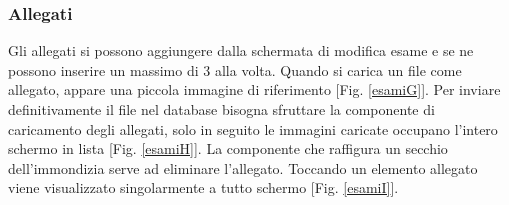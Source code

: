 \documentclass[12pt,a4paper,openright,twoside]{report}
\begin{document}
\subsubsection{Allegati}
Gli allegati si possono aggiungere dalla schermata di modifica esame e se ne possono inserire un massimo di 3 alla volta.
Quando si carica un file come allegato, appare una piccola immagine di riferimento [Fig. \ref{esamiG}]. Per inviare definitivamente il file nel database bisogna sfruttare la componente di caricamento degli allegati, solo in seguito le immagini caricate occupano l'intero schermo in lista [Fig. \ref{esamiH}]. La componente che raffigura un secchio dell'immondizia serve ad eliminare l'allegato.
Toccando un elemento allegato viene visualizzato singolarmente a tutto schermo [Fig. \ref{esamiI}].

\end{document}
